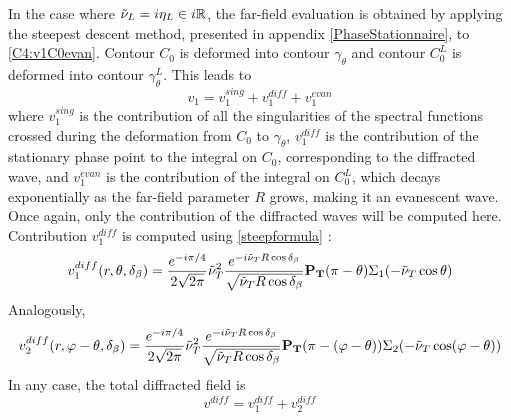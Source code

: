 In the case where $\tilde{\nu}_L=i\eta_L \in i\mathbb{R}$, the far-field evaluation is obtained by applying the steepest descent method, presented in appendix \ref{PhaseStationnaire}, to \eqref{C4:v1C0evan}. Contour $C_0$ is deformed into contour $\gamma_{\theta}$ and contour $C_0^L$ is deformed into contour $\gamma_{\theta}^L$. This leads to
\begin{equation}
v_1=v_1^{sing}+v_1^{diff}+v_1^{evan}
\end{equation}
where $v_1^{sing}$ is the contribution of all the singularities of the spectral functions crossed during the deformation from $C_0$ to $\gamma_{\theta}$, $v_1^{diff}$ is the contribution of the stationary phase point to the integral on $C_0$, corresponding to the diffracted wave, and $v_1^{evan}$ is the contribution of the integral on $C_0^L$, which decays exponentially as the far-field parameter $R$ grows, making it an evanescent wave. Once again, only the contribution of the diffracted waves will be computed here. Contribution $v_1^{diff}$ is computed using \eqref{steepformula} :
\begin{equation}
v_1^{diff}(r,\theta,\delta_{\beta})=\frac{e^{-i\pi/4}}{2\sqrt{2\pi}}\tilde{\nu}_T^2\frac{e^{-i\tilde{\nu}_TR\cos\delta_{\beta}}}{\sqrt{\tilde{\nu}_TR\cos\delta_{\beta}}}\mathbf{P_T}(\pi-\theta)\Sigma_1(-\tilde{\nu}_T\cos\theta)
\end{equation}
Analogously,
\begin{equation}
v_2^{diff}(r,\varphi-\theta,\delta_{\beta})=\frac{e^{-i\pi/4}}{2\sqrt{2\pi}}\tilde{\nu}_T^2\frac{e^{-i\tilde{\nu}_TR\cos\delta_{\beta}}}{\sqrt{\tilde{\nu}_TR\cos\delta_{\beta}}}\mathbf{P_T}(\pi-(\varphi-\theta))\Sigma_2(-\tilde{\nu}_T\cos(\varphi-\theta))
\end{equation}
In any case, the total diffracted field is
\begin{equation}
v^{diff}=v_1^{diff}+v_2^{diff}
\end{equation}

